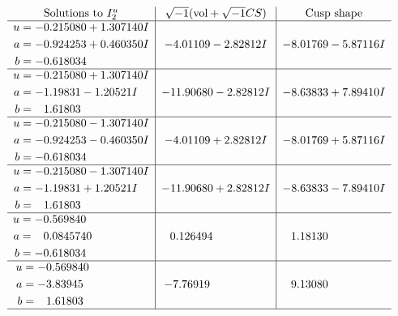 \documentclass[1p]{elsarticle_modified}
\theoremstyle{definition}
\newcommand{\I}{\sqrt{-1}}
\begin{document}
$$\begin{array}{c|c|c}  
\text{Solutions to }I^u_{2}& \I (\text{vol} + \sqrt{-1}CS) & \text{Cusp shape}\\
 \hline 
\begin{aligned}
u &= -0.215080 + 1.307140 I \\
a &= -0.924253 + 0.460350 I \\
b &= -0.618034\phantom{ +0.000000I}\end{aligned}
 & -4.01109 - 2.82812 I & -8.01769 - 5.87116 I \\ \hline\begin{aligned}
u &= -0.215080 + 1.307140 I \\
a &= -1.19831 - 1.20521 I \\
b &= \phantom{-}1.61803\phantom{ +0.000000I}\end{aligned}
 & -11.90680 - 2.82812 I & -8.63833 + 7.89410 I \\ \hline\begin{aligned}
u &= -0.215080 - 1.307140 I \\
a &= -0.924253 - 0.460350 I \\
b &= -0.618034\phantom{ +0.000000I}\end{aligned}
 & -4.01109 + 2.82812 I & -8.01769 + 5.87116 I \\ \hline\begin{aligned}
u &= -0.215080 - 1.307140 I \\
a &= -1.19831 + 1.20521 I \\
b &= \phantom{-}1.61803\phantom{ +0.000000I}\end{aligned}
 & -11.90680 + 2.82812 I & -8.63833 - 7.89410 I \\ \hline\begin{aligned}
u &= -0.569840\phantom{ +0.000000I} \\
a &= \phantom{-}0.0845740\phantom{ +0.000000I} \\
b &= -0.618034\phantom{ +0.000000I}\end{aligned}
 & \phantom{-}0.126494\phantom{ +0.000000I} & \phantom{-}1.18130\phantom{ +0.000000I} \\ \hline\begin{aligned}
u &= -0.569840\phantom{ +0.000000I} \\
a &= -3.83945\phantom{ +0.000000I} \\
b &= \phantom{-}1.61803\phantom{ +0.000000I}\end{aligned}
 & -7.76919\phantom{ +0.000000I} & \phantom{-}9.13080\phantom{ +0.000000I}\\
 \hline 
 \end{array}$$\newpage
\end{document}
